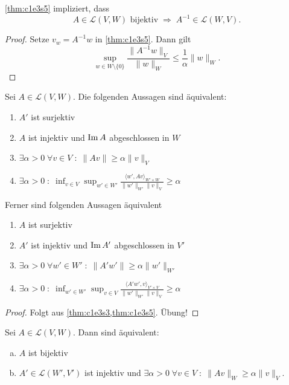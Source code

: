\documentclass[../skript.tex]{subfiles}
\begin{document}
\begin{remark} %
\label{bem:c1e3s6}
\cref{thm:c1e3s5} impliziert, dass
\[
	A \in \mathcal{L}(V, W) \text{ bijektiv} \; \Rightarrow \; A^{-1} \in \mathcal{L}(W, V). 
\]
\end{remark}
\begin{proof}
Setze $v_w = A^{-1} w$ in \cref{thm:c1e3s5}. Dann gilt
\[
	\sup_{w \in W \setminus \{ 0 \}} \frac{\| A^{-1} w \|_V}{\| w \|_W} \leq \frac{1}{\alpha} \| w \|_W.
\]
\end{proof}
\begin{lemma} %
\label{thm:c1e3s7}
Sei $A \in \mathcal{L}(V, W)$. Die folgenden Aussagen sind äquivalent:
\begin{enumerate}
\item $A'$ ist surjektiv
\item $A$ ist injektiv und $\operatorname{Im} A$ abgeschlossen in $W$
\item $\exists \alpha > 0 \; \forall v \in V \; : \; \| A v \| \geq \alpha \| v \|_V$
\item $\exists \alpha > 0 \; : \; \inf_{v \in V} \sup_{w' \in W'} \frac{\langle w', Av \rangle_{W' \times W}}{\| w' \|_{W'} \| v \|_{V}} \geq \alpha$
\end{enumerate}
Ferner sind folgenden Aussagen äquivalent
\begin{enumerate}
\item $A$ ist surjektiv
\item $A'$ ist injektiv und $\operatorname{Im} A'$ abgeschlossen in $V'$
\item $\exists \alpha > 0 \; \forall w' \in W' \; : \; \| A' w' \| \geq \alpha \| w' \|_{W'}$
\item $\exists \alpha > 0 \; : \; \inf_{w' \in W'} \sup_{v \in V} \frac{\langle A' w', v \rangle_{V' \times V}}{\| w' \|_{W'} \| v \|_V} \geq \alpha$
\end{enumerate}
\end{lemma}
\begin{proof}
Folgt aus \cref{thm:c1e3s3,thm:c1e3s5}. Übung!
\end{proof}
\begin{theoremact} %
\label{thm:c1e3s8}
Sei $A \in \mathcal{L}(V, W)$. Dann sind äquivalent:
\begin{enumerate}[(a)]
\item $A$ ist bijektiv
\item $A' \in \mathcal{L}(W', V')$ ist injektiv und $\exists \alpha > 0 \; \forall v \in V \; : \; \| A v \|_W \geq \alpha \| v \|_V$.
\end{enumerate}
\end{theoremact}
\end{document}
